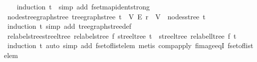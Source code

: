 \begin{isabellebody}
%
\isadelimproof
\ \ %
\endisadelimproof
%
\isatagproof
{}\isamarkupfalse%
\ {\isacharparenleft}{\kern0pt}induction\ t{\isacharparenright}{\kern0pt}\ \ {\isacharparenleft}{\kern0pt}simp\ add{\isacharcolon}{\kern0pt}\ fset{\isachardot}{\kern0pt}map{\isacharunderscore}{\kern0pt}ident{\isacharunderscore}{\kern0pt}strong{\isacharparenright}{\kern0pt}%
\endisatagproof
{\isafoldproof}%
%
\isadelimproof
\isanewline
%
\endisadelimproof
\isanewline
{}\isamarkupfalse%
\ nodes{\isacharunderscore}{\kern0pt}tree{\isacharunderscore}{\kern0pt}graph{\isacharunderscore}{\kern0pt}stree{\isacharcolon}{\kern0pt}\ {\isachardoublequoteopen}tree{\isacharunderscore}{\kern0pt}graph{\isacharunderscore}{\kern0pt}stree\ t\ {\isacharequal}{\kern0pt}\ {\isacharparenleft}{\kern0pt}V{\isacharcomma}{\kern0pt}\ E{\isacharcomma}{\kern0pt}\ r{\isacharparenright}{\kern0pt}\ {\isasymLongrightarrow}\ V\ {\isacharequal}{\kern0pt}\ nodes{\isacharunderscore}{\kern0pt}stree\ t{\isachardoublequoteclose}\isanewline
%
\isadelimproof
\ \ %
\endisadelimproof
%
\isatagproof
{}\isamarkupfalse%
\ {\isacharparenleft}{\kern0pt}induction\ t{\isacharparenright}{\kern0pt}\ {\isacharparenleft}{\kern0pt}simp\ add{\isacharcolon}{\kern0pt}\ tree{\isacharunderscore}{\kern0pt}graph{\isacharunderscore}{\kern0pt}stree{\isacharunderscore}{\kern0pt}def{\isacharparenright}{\kern0pt}%
\endisatagproof
{\isafoldproof}%
%
\isadelimproof
\isanewline
%
\endisadelimproof
\isanewline
{}\isamarkupfalse%
\ relabel{\isacharunderscore}{\kern0pt}stree{\isacharunderscore}{\kern0pt}stree{\isacharunderscore}{\kern0pt}ltree{\isacharcolon}{\kern0pt}\ {\isachardoublequoteopen}relabel{\isacharunderscore}{\kern0pt}stree\ f\ {\isacharparenleft}{\kern0pt}stree{\isacharunderscore}{\kern0pt}ltree\ t{\isacharparenright}{\kern0pt}\ {\isacharequal}{\kern0pt}\ stree{\isacharunderscore}{\kern0pt}ltree\ {\isacharparenleft}{\kern0pt}relabel{\isacharunderscore}{\kern0pt}ltree\ f\ t{\isacharparenright}{\kern0pt}{\isachardoublequoteclose}\isanewline
%
\isadelimproof
\ \ %
\endisadelimproof
%
\isatagproof
{}\isamarkupfalse%
\ {\isacharparenleft}{\kern0pt}induction\ t{\isacharparenright}{\kern0pt}\ {\isacharparenleft}{\kern0pt}auto\ simp\ add{\isacharcolon}{\kern0pt}\ fset{\isacharunderscore}{\kern0pt}of{\isacharunderscore}{\kern0pt}list{\isacharunderscore}{\kern0pt}elem{\isacharcomma}{\kern0pt}\ metis\ comp{\isacharunderscore}{\kern0pt}apply\ fimage{\isacharunderscore}{\kern0pt}eqI\ fset{\isacharunderscore}{\kern0pt}of{\isacharunderscore}{\kern0pt}list{\isacharunderscore}{\kern0pt}elem{\isacharparenright}{\kern0pt}%

\end{isabellebody}
